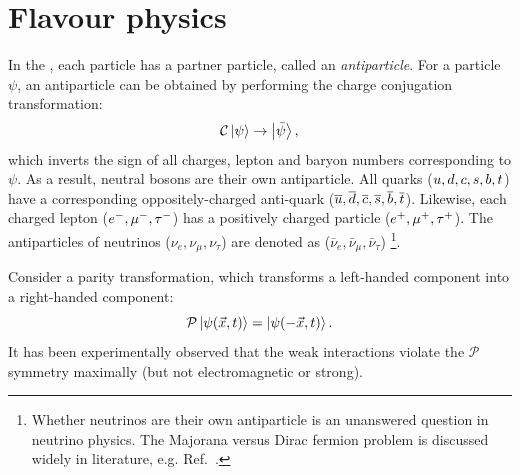 \section{Flavour physics}\label{sec:flavour_physics}

In the \SM, each particle has a partner particle, called an \textit{antiparticle}.
For a particle $\psi$, an antiparticle can be obtained by performing the charge conjugation transformation:
\begin{equation}
    \mathcal{C}\ket{\psi}\rightarrow\ket{\bar{\psi}},
\end{equation}
which inverts the sign of all charges, lepton and baryon numbers corresponding to $\psi$.
As a result, neutral bosons are their own antiparticle.
All quarks ($u,d,c,s,b,t$) have a corresponding oppositely-charged anti-quark ($\overline u,\overline d,\overline c,\overline s,\overline b,\overline t$).
Likewise, each charged lepton ($e^-,\mu^{-},\tau^-$) has a positively charged particle ($e^+,\mu^+,\tau^+$).
The antiparticles of neutrinos ($\nu_{e},\nu_{\mu},\nu_{\tau}$) are denoted as ($\bar{\nu}_{e},\bar{\nu}_{\mu},\bar{\nu}_{\tau}$)
\footnote{Whether neutrinos are their own antiparticle is an unanswered question in neutrino physics. 
The Majorana versus Dirac fermion problem is discussed widely in literature, e.g. Ref.~\cite{Bilenky:2020vjk}.
}.

Consider a parity transformation, which transforms a left-handed component into a right-handed component:
\begin{equation}
    \mathcal{P}\ket{\psi(\vec{x},t)} = \ket{\psi(-\vec{x},t)}.
\end{equation}
It has been experimentally observed that the weak interactions violate the $\mathcal{P}$ symmetry maximally (but not electromagnetic or strong).

